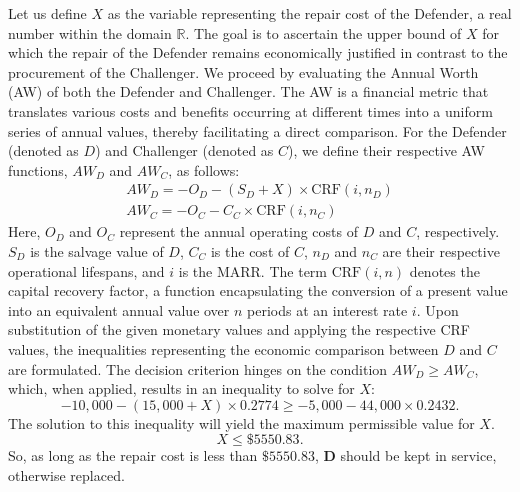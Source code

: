 \documentclass[12pt]{article}
\begin{document}
Let us define \(X\) as the variable representing the repair cost of the Defender, a real number within the domain \(\mathbb{R}\). The goal is to ascertain the upper bound of \(X\) for which the repair of the Defender remains economically justified in contrast to the procurement of the Challenger. We proceed by evaluating the Annual Worth (AW) of both the Defender and Challenger. The AW is a financial metric that translates various costs and benefits occurring at different times into a uniform series of annual values, thereby facilitating a direct comparison. For the Defender (denoted as \(D\)) and Challenger (denoted as \(C\)), we define their respective AW functions, \(AW_D\) and \(AW_C\), as follows: \begin{align*} AW_D = -O_D - (S_D + X) \times \text{CRF}(i, n_D) \\ AW_C = -O_C - C_C \times \text{CRF}(i, n_C) \end{align*} Here, \(O_D\) and \(O_C\) represent the annual operating costs of \(D\) and \(C\), respectively. \(S_D\) is the salvage value of \(D\), \(C_C\) is the cost of \(C\), \(n_D\) and \(n_C\) are their respective operational lifespans, and \(i\) is the MARR. The term \(\text{CRF}(i, n)\) denotes the capital recovery factor, a function encapsulating the conversion of a present value into an equivalent annual value over \(n\) periods at an interest rate \(i\). Upon substitution of the given monetary values and applying the respective CRF values, the inequalities representing the economic comparison between \(D\) and \(C\) are formulated. The decision criterion hinges on the condition \(AW_D \geq AW_C\), which, when applied, results in an inequality to solve for \(X\): \[ -10,000 - (15,000 + X) \times 0.2774 \geq -5,000 - 44,000 \times 0.2432 .\] The solution to this inequality will yield the maximum permissible value for \(X\). \[\boxed{X \leq \$ 5550.83}.\] So, as long as the repair cost is less than \(\$ \textit{5550.83}\), \textbf{D} should be kept in service, otherwise replaced.

\newpage
\end{document}
